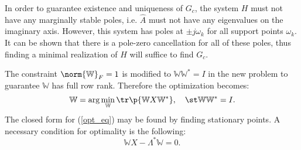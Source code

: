 \documentclass[letterpaper, 10 pt, conference]{ieeeconf}  %
\newcommand{\non}{\nonumber}
\newcommand{\mbb}[1]{\mathbb{#1}}
\begin{document}
\begin{remark}
        In order to guarantee existence and uniqueness of \(G_c\), the system \(H\) must not have any marginally stable poles, i.e. \(\hat{A}\) must not have any eigenvalues on the imaginary axis.  However, this system has poles at \(\pm j\omega_k\) for all support points \(\omega_k\).  It can be shown that there is a pole-zero cancellation for all of these poles, thus finding a minimal realization of \(H\) will suffice to find \(G_c\).  
\end{remark}
The constraint \(\norm{\mathbb{W}}_F = 1\) is modified to \(\mathbb{W}\mathbb{W}^* = I\) in the new problem to guarantee \(\mbb{W}\) has full row rank.  Therefore the optimization becomes:
\begin{equation}
        \mbb{W} = \arg\min_{\mbb{W}} \tr\p{\mbb{W}X\mbb{W}^*}, \quad \st \mbb{W}\mbb{W}^* = I. \label{opt_eq} 
\end{equation}
The closed form for (\ref{opt_eq}) may be found by finding stationary points.  A necessary condition for optimality is the following:
\begin{equation}
        \mbb{W}X - \Lambda^* \mbb{W} = 0. \label{eig_eq}
\end{equation}
\begin{comment}
        \begin{align}
        L &= \tr \p{\mbb{W}X\mbb{W}^*} + \tr \p{\Lambda^* (I - \mbb{W}\mbb{W}^*)} \non \\
        &= \tr \p{\mbb{W}X\mbb{W}^* - \Lambda^*\mbb{W}\mbb{W}^*} + \tr\Lambda^* \non \\
        \partial_\mbb{W} L(V) &= \tr \p{2\mbb{W}XV^* - 2\Lambda^*\mbb{W}V^*} \non \\
        &= 2\tr \p{(\mbb{W}X - \Lambda^* \mbb{W})V^*} = 0 \non \\
        \therefore 0 &= \mbb{W}X - \Lambda^* \mbb{W} \label{eig_eq}
        \end{align}
\end{comment}
\end{document}
